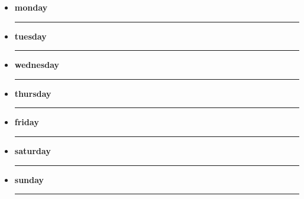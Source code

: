 \documentclass[twocolumn]{book}
\begin{document}
\pagestyle{fancy}
\fancyhead{} %

\phantom{.}
\vspace{0.5cm}

\begin{todo}{}
\end{todo}
\begin{notes}{}
\end{notes}

\vfill\eject %

\phantom{.}
\vspace{0.5cm}

\begin{days}
	\begin{itemize} \setlength\itemsep{2.55cm}
		\item[] \Large{\bfseries{monday}}\hrule
		\item[] \Large{\bfseries{tuesday}}\hrule
		\item[] \Large{\bfseries{wednesday}}\hrule
		\item[] \Large{\bfseries{thursday}}\hrule
		\item[] \Large{\bfseries{friday}}\hrule
		\item[] \Large{\bfseries{saturday}}\hrule
		\item[] \Large{\bfseries{sunday}}\hrule
	\end{itemize}
\end{days}
\end{document}
